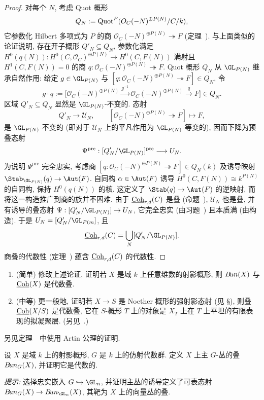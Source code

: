 \begin{proof}
对每个 $N$, 考虑 Quot 概形
\[
Q_N:=\operatorname{Quot}^P(O_C(-N)^{\oplus P(N)}/C/k),
\]
它参数化 Hilbert 多项式为 $P$ 的商 $\mathcal O_C(-N)^{\oplus P(N)}\twoheadrightarrow F$ (定理~).
与上面类似的论证说明, 存在开子概形 $Q'_N\subseteq Q_N$, 参数化满足
$H^0(q(N)):H^0(C,\mathcal O_C)^{\oplus P(N)}\to H^0(C,F(N))$ 满射且 $H^1(C,F(N))=0$ 的商 $q:\mathcal O_C(-N)^{\oplus P(N)}\twoheadrightarrow F$.
Quot 概形 $Q_N$ 从 $\GL_{P(N)}$ 继承自然作用: 给定 $g\in\GL_{P(N)}$ 与 $[q:\mathcal O_C(-N)^{\oplus P(N)}\twoheadrightarrow F]\in Q_N$, 令
\[
g\cdot q:=
\bigl[\mathcal O_C(-N)^{\oplus P(N)}\xrightarrow{g^{-1}}
\mathcal O_C(-N)^{\oplus P(N)}\xrightarrow{q}F\bigr]\in Q_N.
\]
区域 $Q'_N\subseteq Q_N$ 显然是 $\GL_{P(N)}$-不变的. 态射
\[
Q'_N\longrightarrow\mathcal U_N,\qquad
[\mathcal O_C(-N)^{\oplus P(N)}\twoheadrightarrow F]\longmapsto F,
\]
是 $\GL_{P(N)}$-不变的 (即对于 $\mathcal U_N$ 上的平凡作用为 $\GL_{P(N)}$-等变的), 因而下降为预叠态射
\[
\Psi^{\mathrm{pre}}:[Q'_N/\GL_{P(N)}]^{\mathrm{pre}}\longrightarrow\mathcal U_N.
\]
为说明 $\Psi^{\mathrm{pre}}$ 完全忠实, 考虑商 $[q:\mathcal O_C(-N)^{\oplus P(N)}\twoheadrightarrow F]\in Q_N(k)$ 及诱导映射 $\Stab_{\GL_{P(N)}}(q)\to\Aut(F)$.
自同构 $\alpha\in\Aut(F)$ 诱导 $H^0(C,F(N))\cong k^{P(N)}$ 的自同构, 保持 $H^0(q(N))$ 的核.
这定义了 $\Stab(q)\to\Aut(F)$ 的逆映射, 而将这一构造推广到商的族并不困难.
由于 $\underline{\mathrm{Coh}}_{r,d}(C)$ 是叠 (命题~), $\mathcal U_N$ 也是叠, 并有诱导的叠态射 $\Psi:[Q'_N/\GL_{P(N)}]\to\mathcal U_N$, 它完全忠实 (由习题~) 且本质满 (由构造).
于是 $\mathcal U_N=[Q'_N/\GL_{P(m}]$, 且
\[
\Coh_{r,d}(C)=\bigcup_N[Q'_N/\GL_{P(N)}].
\]
商叠的代数性 (定理~) 蕴含 $\underline{\mathrm{Coh}}_{r,d}(C)$ 的代数性.
\end{proof}
\begin{exercise}\label{src:4.1.25}
\begin{enumerate}[(1)]
\item (简单) 修改上述论证, 证明若 $X$ 是域 $k$ 上任意维数的射影概形, 则 $B\!un(X)$ 与 $\underline{\mathrm{Coh}}(X)$ 是代数叠.
\item (中等) 更一般地, 证明若 $X\to S$ 是 Noether 概形的强射影态射 (见 \S{}), 则叠 $\underline{\mathrm{Coh}}(X/S)$ 是代数叠, 它在 $S$-概形 $T$ 上的对象是 $X_T$ 上在 $T$ 上平坦的有限表现的拟凝聚层. (另见~\cite[定理 $4.6.2.1$]{LMB00}.)
\end{enumerate}
另见定理~~中使用 Artin 公理的证明.
\end{exercise}
\begin{exercise}[困难]\label{src:4.1.26}
设 $X$ 是域 $k$ 上的射影概形, $G$ 是 $k$ 上的仿射代数群. 定义 $X$ 上主 $G$-丛的叠 $B\!un_G(X)$, 并证明它是代数的.

\textit{提示:} 选择忠实嵌入 $G\hookrightarrow\GL_n$, 并证明主丛的诱导定义了可表态射 $\cBun_G(X)\to\cBun_{\GL_n}(X)$, 其靶为 $X$ 上的向量丛的叠.
\end{exercise}
